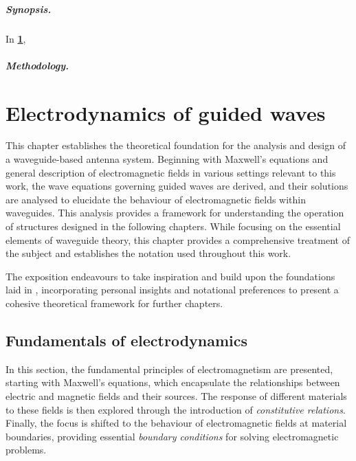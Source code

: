 \documentclass[11pt,a4paper,twoside,openany]{report}
\begin{document}
\paragraph*{Synopsis.} In \textbf{\cref{chap:electrodynamics}}, \lipsum[4]

\paragraph*{Methodology.} \lipsum[4]


\chapter{Electrodynamics of guided waves}
\label{chap:electrodynamics}
This chapter establishes the theoretical foundation for the analysis and design of a waveguide-based antenna system. Beginning with Maxwell's equations and general description of electromagnetic fields in various settings relevant to this work, the wave equations governing guided waves are derived, and their solutions are analysed to elucidate the behaviour of electromagnetic fields within waveguides. This analysis provides a framework for understanding the operation of structures designed in the following chapters. While focusing on the essential elements of waveguide theory, this chapter provides a comprehensive treatment of the subject and establishes the notation used throughout this work.

The exposition endeavours to take inspiration and build upon the foundations laid in \parencite{balanis:advanced-engineering-electromagnetics,griffiths:introduction-to-electrodynamics,zangwill:modern-electrodynamics}, incorporating personal insights and notational preferences to present a cohesive theoretical framework for further chapters.

\section{Fundamentals of electrodynamics}
\label{sec:fundamentals-of-electrodynamics}
In this section, the fundamental principles of electromagnetism are presented, starting with Maxwell's equations, which encapsulate the relationships between electric and magnetic fields and their sources. The response of different materials to these fields is then explored through the introduction of \emph{constitutive relations}. Finally, the focus is shifted to the behaviour of electromagnetic fields at material boundaries, providing essential \emph{boundary conditions} for solving electromagnetic problems.
\end{document}
